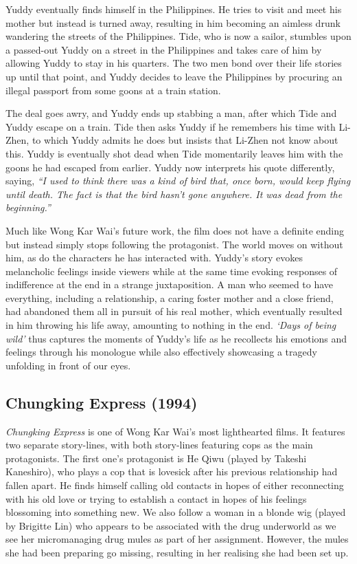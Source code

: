 \begin{multicols}{2}
Yuddy eventually finds himself in the Philippines. He tries to visit and meet his mother but instead is turned away, resulting in him becoming an aimless drunk wandering the streets of the Philippines. Tide, who is now a sailor, stumbles upon a passed-out Yuddy on a street in the Philippines and takes care of him by allowing Yuddy to stay in his quarters. The two men bond over their life stories up until that point, and Yuddy decides to leave the Philippines by procuring an illegal passport from some goons at a train station. 

The deal goes awry, and Yuddy ends up stabbing a man, after which Tide and Yuddy escape on a train. Tide then asks Yuddy if he remembers his time with Li-Zhen, to which Yuddy admits he does but insists that Li-Zhen not know about this. Yuddy is eventually shot dead when Tide momentarily leaves him with the goons he had escaped from earlier. Yuddy now interprets his quote differently, saying, \emph{“I used to think there was a kind of bird that, once born, would keep flying until death. The fact is that the bird hasn't gone anywhere. It was dead from the beginning.”}

Much like Wong Kar Wai’s future work, the film does not have a definite ending but instead simply stops following the protagonist. The world moves on without him, as do the characters he has interacted with. Yuddy’s story evokes melancholic feelings inside viewers while at the same time evoking responses of indifference at the end in a strange juxtaposition. A man who seemed to have everything, including a relationship, a caring foster mother and a close friend, had abandoned them all in pursuit of his real mother, which eventually resulted in him throwing his life away, amounting to nothing in the end. \emph{‘Days of being wild’} thus captures the moments of Yuddy’s life as he recollects his emotions and feelings through his monologue while also effectively showcasing a tragedy unfolding in front of our eyes.



\subsection{Chungking Express (1994)}
\emph{Chungking Express} is one of Wong Kar Wai’s most lighthearted films. It features two separate story-lines, with both story-lines featuring cops as the main protagonists. The first one’s protagonist is He Qiwu (played by Takeshi Kaneshiro), who plays a cop that is lovesick after his previous relationship had fallen apart. He finds himself calling old contacts in hopes of either reconnecting with his old love or trying to establish a contact in hopes of his feelings blossoming into something new. We also follow a woman in a blonde wig (played by Brigitte Lin) who appears to be associated with the drug underworld as we see her micromanaging drug mules as part of her assignment. However, the mules she had been preparing go missing, resulting in her realising she had been set up. 


\end{multicols}
